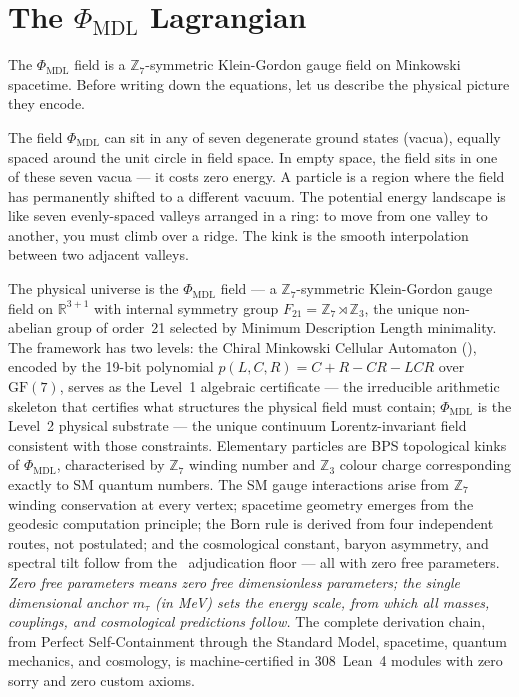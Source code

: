 \documentclass[11pt,openany]{book}
\theoremstyle{remark}
\newcommand{\PSC}{\text{PSC}}
\newcommand{\PHIMDL}{\Phi_{\mathrm{MDL}}}
\newcommand{\CMCA}{\text{CMCA}}
\newcommand{\poly}{p(L,C,R)}
\begin{document}
\section{The $\Phi_{\mathrm{MDL}}$ Lagrangian}
\label{sec:lagrangian}

The $\PHIMDL$ field is a $\mathbb{Z}_7$-symmetric Klein-Gordon gauge field on Minkowski
spacetime.
Before writing down the equations, let us describe the physical picture they encode.

The field $\PHIMDL$ can sit in any of seven degenerate ground states (vacua), equally
spaced around the unit circle in field space.
In empty space, the field sits in one of these seven vacua --- it costs zero energy.
A particle is a region where the field has permanently shifted to a different vacuum.
The potential energy landscape is like seven evenly-spaced valleys arranged in a ring:
to move from one valley to another, you must climb over a ridge.
The kink is the smooth interpolation between two adjacent valleys.

\begin{tcolorbox}[colback=green!5,colframe=green!50!black,
  title={Statement of the Theory},breakable]
The physical universe is the $\PHIMDL$ field --- a $\mathbb{Z}_7$-symmetric
Klein-Gordon gauge field on $\mathbb{R}^{3+1}$ with internal symmetry group
$F_{21} = \mathbb{Z}_7 \rtimes \mathbb{Z}_3$, the unique non-abelian group of
order~21 selected by Minimum Description Length minimality.
The framework has two levels: the Chiral Minkowski Cellular Automaton (\CMCA),
encoded by the 19-bit polynomial $\poly = C{+}R{-}CR{-}LCR$ over $\mathrm{GF}(7)$,
serves as the Level~1 algebraic certificate --- the irreducible arithmetic
skeleton that certifies what structures the physical field must contain;
$\PHIMDL$ is the Level~2 physical substrate --- the unique continuum
Lorentz-invariant field consistent with those constraints.
Elementary particles are BPS topological kinks of $\PHIMDL$, characterised
by $\mathbb{Z}_7$ winding number and $\mathbb{Z}_3$ colour charge
corresponding exactly to SM quantum numbers.
The SM gauge interactions arise from $\mathbb{Z}_7$ winding conservation at
every vertex; spacetime geometry emerges from the geodesic computation
principle; the Born rule is derived from four independent routes, not
postulated; and the cosmological constant, baryon asymmetry, and spectral
tilt follow from the \PSC\ adjudication floor --- all with zero free
parameters.
\emph{Zero free parameters means zero free dimensionless parameters; the single
dimensional anchor $m_\tau$ (in MeV) sets the energy scale, from which all masses,
couplings, and cosmological predictions follow.}
The complete derivation chain, from Perfect Self-Containment through the
Standard Model, spacetime, quantum mechanics, and cosmology, is
machine-certified in 308~Lean~4 modules with zero sorry and zero custom axioms.
\end{tcolorbox}
\end{document}
